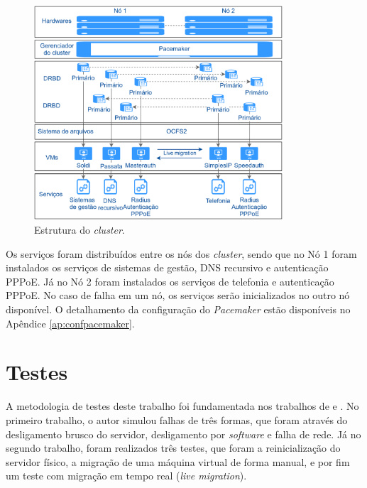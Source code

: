 \begin{figure}[h!]
 \centering
 \includegraphics[width=350px]{img/projeto_estrutura.eps}
 \caption{Estrutura do \textit{cluster}.}
 \label{fig:projeto_estrutura}
\end{figure}


Os serviços foram distribuídos entre os nós dos \textit{cluster}, sendo que no Nó 1 foram instalados os serviços de sistemas de gestão, 
\ac{DNS} recursivo e autenticação \ac{PPPoE}. Já no Nó 2 foram instalados os serviços de telefonia e autenticação \ac{PPPoE}.
No caso de falha em um nó, os serviços serão inicializados no outro nó disponível. O detalhamento da configuração do \textit{Pacemaker} 
estão disponíveis no Apêndice \ref{ap:confpacemaker}.


\section{Testes}

A metodologia de testes deste trabalho foi fundamentada nos trabalhos de \citet{reis2009} e \citet{goncalves2009}. No primeiro trabalho, 
o autor simulou falhas de três formas, que foram através do desligamento brusco do servidor, desligamento por \textit{software} e falha de rede. 
Já no segundo trabalho, foram realizados três testes, que foram a reinicialização do servidor físico, a migração de uma máquina virtual de forma
manual, e por fim um teste com migração em tempo real (\textit{live migration}).

